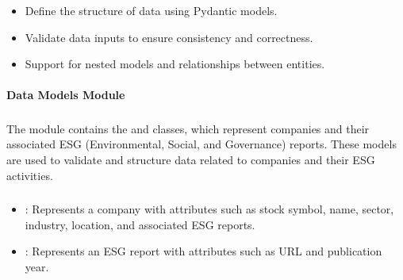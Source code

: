 \documentclass[letterpaper,10pt,english]{sphinxmanual}
\begin{document}
\subsubsection*{}
\begin{itemize}
\item {} 
\sphinxAtStartPar
Define the structure of data using Pydantic models.

\item {} 
\sphinxAtStartPar
Validate data inputs to ensure consistency and correctness.

\item {} 
\sphinxAtStartPar
Support for nested models and relationships between entities.

\end{itemize}


\paragraph{Data Models Module}
\label{\detokenize{src.data_models:module-src.data_models.company}}\label{\detokenize{src.data_models:data-models-module}}\subsubsection*{}

\sphinxAtStartPar
The  module contains the  and  classes, which represent companies and their
associated ESG (Environmental, Social, and Governance) reports. These models are used to validate and
structure data related to companies and their ESG activities.
\subsubsection*{}
\begin{itemize}
\item {} 
\sphinxAtStartPar
{}: Represents a company with attributes such as stock symbol, name, sector, industry,
location, and associated ESG reports.

\item {} 
\sphinxAtStartPar
{}: Represents an ESG report with attributes such as URL and publication year.

\end{itemize}
\end{document}
